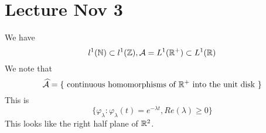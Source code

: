 \section{Lecture Nov 3}
We have 
\begin{equation*}
    l^1(\mathbb{N})\subset l^1(\mathbb{Z}), \mathcal{A}=L^1(\mathbb{R}^+)\subset L^1(\mathbb{R})
\end{equation*}
We note that 
\begin{equation*}
    \widehat{\mathcal{A}}=\{\text{ continuous homomorphisms of } \mathbb{R}^+ \text{ into the unit disk }\}
\end{equation*}
This is 
\begin{equation*}
    \{\varphi_\lambda: \varphi_\lambda(t)=e^{-\lambda t}, Re(\lambda)\geq 0\}
\end{equation*}
This looks like the right half plane of $\mathbb{R}^2$.

